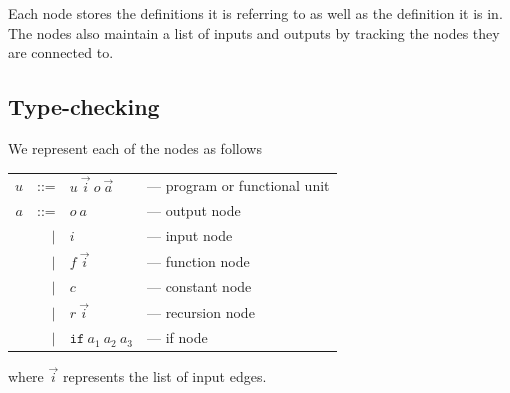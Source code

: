 \documentclass[12pt,UTF8,a4]{article}
\newcommand{\code}[1]{\texttt{#1}}
\begin{document}
Each node stores the definitions it is referring to as well as the definition it is in. The nodes also maintain a list of inputs and outputs by tracking the nodes they are connected to.

\subsection{Type-checking}
We represent each of the nodes as follows
\begin{center}
  \begin{tabular}{rrll}
    $u$ & ::= & $u\ \vec{i}\ o\ \vec{a}$ & --- program or functional unit
    \\
    $a$ & ::= & $o\ a$ & --- output node
    \\
    & $|$ & $i$ &  --- input node
    \\
    & $|$ & $f\ \vec{i}$ &  --- function node
    \\
    & $|$ & $c$ &  --- constant node
    \\
    & $|$ & $r\ \vec{i}$ &  --- recursion node
    \\
    & $|$ & $\code{if}\ a_1\ a_2\ a_3$ &  --- if node
    \\
  \end{tabular}
\end{center}
where $\vec{i}$ represents the list of input edges.
\end{document}
